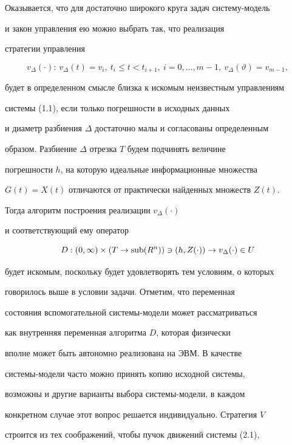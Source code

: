  


Оказывается, что для достаточно широкого круга задач систему-модель 


и закон управления ею можно выбрать так, что реализация 


стратегии управления 


$$ 


v_\Delta(\cdot):\ v_\Delta(t)=v_i,\ t_i\le t<t_{i+1}, 


\ i=0,\dotsc,m-1,\ v_\Delta(\vartheta)=v_{m-1}, 


$$ 


будет в определенном смысле близка к искомым неизвестным управлениям 


системы (1.1), если только погрешности в исходных данных 


и диаметр разбиения $\Delta$ достаточно малы и согласованы определенным 


образом. Разбиение $\Delta$ отрезка $T$ будем подчинять величине 


погрешности $h$, на которую идеальные информационные множества 


$G(t)=X(t)$ отличаются от практически найденных множеств $Z(t)$. 


Тогда алгоритм построения реализации $v_\Delta(\cdot)$ 


и соответствующий ему оператор 


$$ 


D:(0,\infty)\times(T\to\sub(R^n))\owns(h,Z(\cdot))\to 


v_\Delta(\cdot)\in U 


$$ 


будет искомым, поскольку будет удовлетворять тем условиям, о которых 


говорилось выше в условии задачи. Отметим, что переменная 


состояния вспомогательной системы-модели может рассматриваться 


как внутренняя переменная алгоритма $D$, которая физически 


вполне может быть автономно реализована на ЭВМ. В качестве 


системы-модели часто можно принять копию исходной системы, 


возможны и другие варианты выбора системы-модели, в каждом 


конкретном случае этот вопрос решается индивидуально. Стратегия $V$ 


строится из тех соображений, чтобы пучок движений системы (2.1), 


